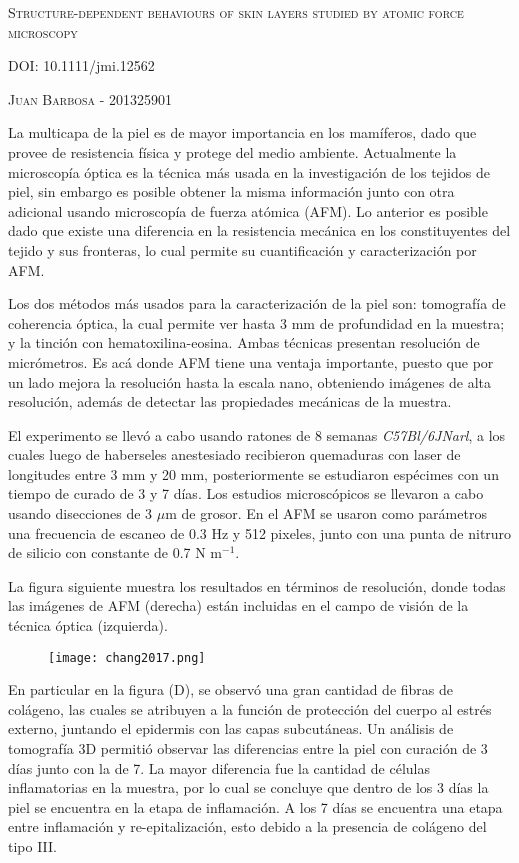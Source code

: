 \documentclass[addpoints,11pt]{exam}
\begin{document}
	\begin{center}
		\LARGE\scshape{Structure-dependent behaviours of skin layers studied by atomic force microscopy}
		\vspace{0.5cm}
		
		\large DOI: 10.1111/jmi.12562
		
		\vspace{1cm}
		\large\scshape{Juan Barbosa - 201325901}
	\end{center}
	
	La multicapa de la piel es de mayor importancia en los mam\'iferos, dado que provee de resistencia f\'isica y protege del medio ambiente. Actualmente la microscop\'ia \'optica es la t\'ecnica m\'as usada en la investigaci\'on de los tejidos de piel, sin embargo es posible obtener la misma informaci\'on junto con otra adicional usando microscop\'ia de fuerza at\'omica (AFM). Lo anterior es posible dado que existe una diferencia en la resistencia mec\'anica en los constituyentes del tejido y sus fronteras, lo cual permite su cuantificaci\'on y caracterizaci\'on por AFM.
	
	Los dos m\'etodos m\'as usados para la caracterizaci\'on de la piel son: tomograf\'ia de coherencia \'optica, la cual permite ver hasta 3 mm de profundidad en la muestra; y la tinción con hematoxilina-eosina. Ambas t\'ecnicas presentan resoluci\'on de micr\'ometros. Es ac\'a donde AFM tiene una ventaja importante, puesto que por un lado mejora la resoluci\'on hasta la escala nano, obteniendo im\'agenes de alta resoluci\'on, adem\'as de detectar las propiedades mec\'anicas de la muestra.
	
	El experimento se llev\'o a cabo usando ratones de 8 semanas \textit{C57Bl/6JNarl}, a los cuales luego de haberseles anestesiado recibieron quemaduras con laser de longitudes entre 3 mm y 20 mm, posteriormente se estudiaron esp\'ecimes con un tiempo de curado de 3 y 7 d\'ias. Los estudios microsc\'opicos se llevaron a cabo usando disecciones de 3 $\mu$m de grosor. En el AFM se usaron como par\'ametros una frecuencia de escaneo de 0.3 Hz y 512 pixeles, junto con una punta de nitruro de silicio con constante de 0.7 N m$^{-1}$.
	
	La figura siguiente muestra los resultados en t\'erminos de resoluci\'on, donde todas las im\'agenes de AFM (derecha) est\'an incluidas en el campo de visi\'on de la t\'ecnica \'optica (izquierda).
	\begin{figure}[h]
		\centering
		\texttt{[image: chang2017.png]}
	\end{figure}
	\newpage
	
	En particular en la figura (D), se observ\'o una gran cantidad de fibras de col\'ageno, las cuales se atribuyen a la funci\'on de protecci\'on del cuerpo al estr\'es externo, juntando el epidermis con las capas subcut\'aneas. Un an\'alisis de tomograf\'ia 3D permiti\'o observar las diferencias entre la piel con curaci\'on de 3 d\'ias junto con la de 7. La mayor diferencia fue la cantidad de c\'elulas inflamatorias en la muestra, por lo cual se concluye que dentro de los 3 d\'ias la piel se encuentra en la etapa de inflamaci\'on. A los 7 d\'ias se encuentra una etapa entre inflamaci\'on y re-epitalizaci\'on, esto debido a la presencia de col\'ageno del tipo III.
\end{document}
